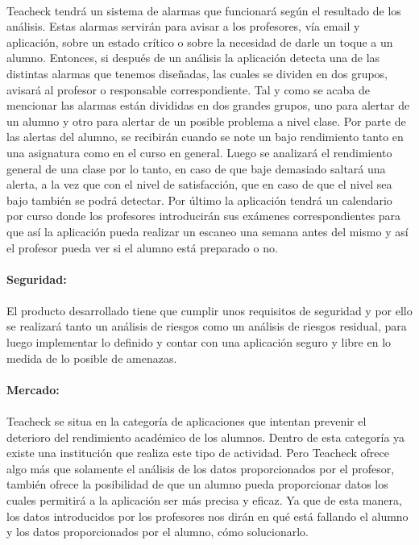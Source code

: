 \paragraph{}
Teacheck tendrá un sistema de alarmas que funcionará según el resultado de los análisis. Estas alarmas servirán para avisar a los profesores, vía email y aplicación, sobre un estado crítico o sobre la necesidad de darle un toque a un alumno. Entonces, si después de un análisis la aplicación detecta una de las distintas alarmas que tenemos diseñadas, las cuales se dividen en dos grupos, avisará al profesor o responsable correspondiente. Tal y como se acaba de mencionar las alarmas están divididas en dos grandes grupos, uno para alertar de un alumno y otro para alertar de un posible problema a nivel clase. Por parte de las alertas del alumno, se recibirán cuando se note un bajo rendimiento tanto en una asignatura como en el curso en general. Luego se analizará el rendimiento general de una clase por lo tanto, en caso de que baje demasiado saltará una alerta, a la vez que con el nivel de satisfacción, que en caso de que el nivel sea bajo también se podrá detectar. Por último la aplicación tendrá un calendario por curso donde los profesores introducirán sus exámenes correspondientes para que así la aplicación pueda realizar un escaneo una semana antes del mismo y así el profesor pueda ver si el alumno está preparado o no.\\
\\
\textbf{Seguridad:}
\paragraph{}
El producto desarrollado tiene que cumplir unos requisitos de seguridad y por ello se realizará tanto un análisis de riesgos como un análisis de riesgos residual, para luego implementar lo definido y contar con una aplicación seguro y libre en lo medida de lo posible de amenazas.\\
\\
\textbf{Mercado:}
\paragraph{} Teacheck se situa en la categoría de aplicaciones que intentan prevenir el deterioro del rendimiento académico de los alumnos. Dentro de esta categoría ya existe una institución que realiza este tipo de actividad. Pero Teacheck ofrece algo más que solamente el análisis de los datos proporcionados por el profesor, también ofrece la posibilidad de que un alumno pueda proporcionar datos los cuales permitirá a la aplicación ser más precisa y eficaz.
Ya que de esta manera, los datos introducidos por los profesores nos
dirán en qué está fallando el alumno y los datos proporcionados por el
alumno, cómo solucionarlo.

